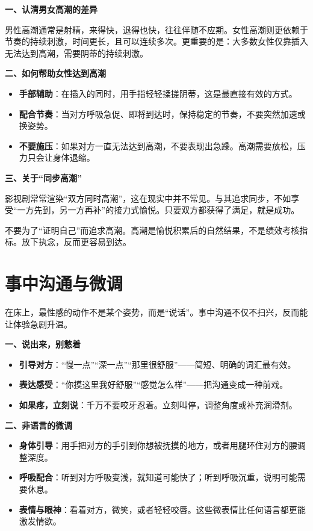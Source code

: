 \documentclass[12pt,UTF8]{ctexbook}
\begin{document}
\textbf{一、认清男女高潮的差异}

男性高潮通常是射精，来得快，退得也快，往往伴随不应期。女性高潮则更依赖于节奏的持续刺激，时间更长，且可以连续多次。更重要的是：大多数女性仅靠插入无法达到高潮，需要阴蒂的持续刺激。

\textbf{二、如何帮助女性达到高潮}

\begin{itemize}
\item \textbf{手部辅助}：在插入的同时，用手指轻轻揉搓阴蒂，这是最直接有效的方式。
\item \textbf{配合节奏}：当对方呼吸急促、即将到达时，保持稳定的节奏，不要突然加速或换姿势。
\item \textbf{不要施压}：如果对方一直无法达到高潮，不要表现出急躁。高潮需要放松，压力只会让身体退缩。
\end{itemize}

\textbf{三、关于“同步高潮”}

影视剧常常渲染“双方同时高潮”，这在现实中并不常见。与其追求同步，不如享受“一方先到，另一方再补”的接力式愉悦。只要双方都获得了满足，就是成功。

\begin{tcolorbox}[colback=pink!5!white,colframe=red!50!black,title=贴心小叮咛]
不要为了“证明自己”而追求高潮。高潮是愉悦积累后的自然结果，不是绩效考核指标。放下执念，反而更容易到达。
\end{tcolorbox}

\section{事中沟通与微调}

在床上，最性感的动作不是某个姿势，而是“说话”。事中沟通不仅不扫兴，反而能让体验急剧升温。

\textbf{一、说出来，别憋着}

\begin{itemize}
\item \textbf{引导对方}：“慢一点”“深一点”“那里很舒服”——简短、明确的词汇最有效。
\item \textbf{表达感受}：“你摸这里我好舒服”“感觉怎么样”——把沟通变成一种前戏。
\item \textbf{如果疼，立刻说}：千万不要咬牙忍着。立刻叫停，调整角度或补充润滑剂。
\end{itemize}

\textbf{二、非语言的微调}

\begin{itemize}
\item \textbf{身体引导}：用手把对方的手引到你想被抚摸的地方，或者用腿环住对方的腰调整深度。
\item \textbf{呼吸配合}：听到对方呼吸变浅，就知道可能快了；听到呼吸沉重，说明可能需要休息。
\item \textbf{表情与眼神}：看着对方，微笑，或者轻轻咬唇。这些微表情比任何语言都更能激发情欲。
\end{itemize}
\end{document}
